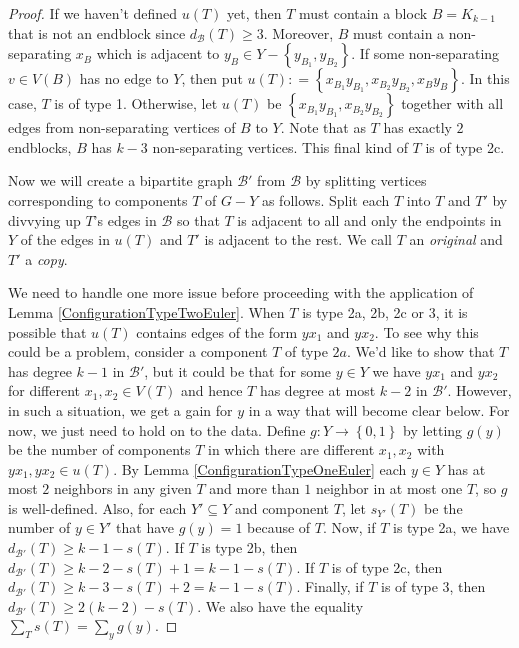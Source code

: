 \documentclass[12pt]{article}
\theoremstyle{plain}
\theoremstyle{definition}
\theoremstyle{remark}
\newcommand{\fancy}[1]{\mathcal{#1}}
\newcommand{\B}{\fancy{B}}
\newcommand{\set}[1]{\left\{ #1 \right\}}
\newcommand{\func}[3]{#1\colon #2 \rightarrow #3}
\newcommand{\DefinedAs}{\mathrel{\mathop:}=}
\begin{document}
\begin{proof}
If we haven't defined $u(T)$ yet, then $T$ must contain a block $B = K_{k-1}$ that is not an endblock since $d_{\B}(T) \geq 3$.  Moreover, $B$ must contain a non-separating $x_B$ which is adjacent to $y_B \in Y - \set{y_{B_1}, y_{B_2}}$. If some non-separating $v \in V(B)$ has no edge to $Y$, then put $u(T) \DefinedAs \set{x_{B_1}y_{B_1}, x_{B_2}y_{B_2}, x_{B}y_{B}}$.  In this case, $T$ is of type 1.  Otherwise, let $u(T)$ be $\set{x_{B_1}y_{B_1}, x_{B_2}y_{B_2}}$ together with all edges from non-separating vertices of $B$ to $Y$. Note that as $T$ has exactly $2$ endblocks, $B$ has $k-3$ non-separating vertices.  This final kind of $T$ is of type 2c.

Now we will create a bipartite graph $\B'$ from $\B$ by splitting vertices corresponding to components $T$ of $G-Y$ as follows. Split each $T$ into $T$ and $T'$ by divvying up $T$'s edges in $\B$ so that $T$ is adjacent to all and only the endpoints in $Y$ of the edges in $u(T)$ and $T'$ is adjacent to the rest.  We call $T$ an \emph{original} and $T'$ a \emph{copy}. 

We need to handle one more issue before proceeding with the application of Lemma \ref{ConfigurationTypeTwoEuler}.  When $T$ is type 2a, 2b, 2c or 3, it is possible that $u(T)$ contains edges of the form $yx_1$ and $yx_2$.  To see why this could be a problem, consider a component $T$ of type $2a$.  We'd like to show that $T$ has degree $k-1$ in $\B'$, but it could be that for some $y \in Y$ we have $yx_1$ and $yx_2$ for different $x_1, x_2 \in V(T)$ and hence $T$ has degree at most $k-2$ in $\B'$.  However, in such a situation, we get a gain for $y$ in a way that will become clear below.  For now, we just need to hold on to the data.  Define $\func{g}{Y}{\set{0,1}}$ by letting $g(y)$ be the number of components $T$ in which there are different $x_1, x_2$ with $yx_1, yx_2 \in u(T)$. By Lemma \ref{ConfigurationTypeOneEuler} each $y \in Y$ has at most $2$ neighbors in any given $T$ and more than $1$ neighbor in at most one $T$, so $g$ is well-defined.  Also, for each $Y' \subseteq Y$ and component $T$, let $s_{Y'}(T)$ be the number of $y \in Y'$ that have $g(y)=1$ because of $T$.  Now, if $T$ is type 2a, we have $d_{\B'}(T) \geq k-1 - s(T)$.  If $T$ is type 2b, then $d_{\B'}(T) \geq k-2 - s(T) + 1 = k-1 - s(T)$.  If $T$ is of type 2c, then $d_{\B'}(T) \geq k-3 - s(T) + 2 = k-1 - s(T)$.  Finally, if $T$ is of type 3, then $d_{\B'}(T) \geq 2(k-2) - s(T)$.  We also have the equality $\sum_{T} s(T) = \sum_{y} g(y)$.


\end{proof}
\end{document}
